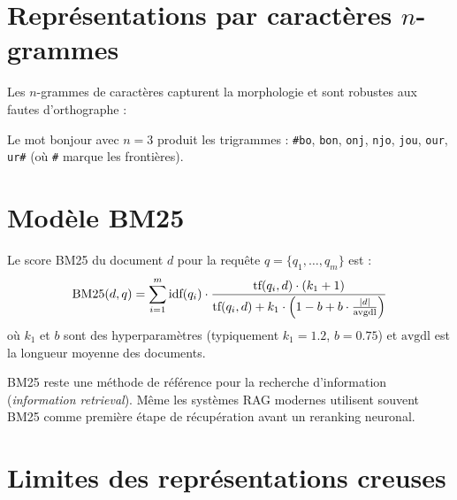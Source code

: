 \section{Repr\'esentations par caract\`eres $n$-grammes}
\label{sec:rep:char}

Les $n$-grammes de caract\`eres capturent la morphologie et sont robustes aux
fautes d'orthographe :

\begin{exemple}
Le mot \og bonjour \fg avec $n=3$ produit les trigrammes :
\texttt{\#bo}, \texttt{bon}, \texttt{onj}, \texttt{njo}, \texttt{jou},
\texttt{our}, \texttt{ur\#} (o\`u \texttt{\#} marque les fronti\`eres).
\end{exemple}

\section{Mod\`ele BM25}
\label{sec:rep:bm25}

\begin{definition}[BM25]
Le score BM25 du document $d$ pour la requ\^ete $q = \{q_1, \ldots, q_m\}$ est :
\[
\text{BM25}(d, q) = \sum_{i=1}^{m} \text{idf}(q_i) \cdot
\frac{\text{tf}(q_i, d) \cdot (k_1 + 1)}{\text{tf}(q_i, d) + k_1 \cdot \left(1 - b + b \cdot \frac{\left| d \right|}{\text{avgdl}}\right)}
\]
o\`u $k_1$ et $b$ sont des hyperparam\`etres (typiquement $k_1 = 1.2$, $b = 0.75$)
et $\text{avgdl}$ est la longueur moyenne des documents.
\end{definition}

\begin{bonnepratique}[title=\textbf{BM25 en pratique}]
BM25 reste une m\'ethode de r\'ef\'erence pour la recherche d'information
(\emph{information retrieval}). M\^eme les syst\`emes RAG modernes utilisent
souvent BM25 comme premi\`ere \'etape de r\'ecup\'eration avant un reranking
neuronal.
\end{bonnepratique}

\section{Limites des repr\'esentations creuses}
\label{sec:rep:limites}

